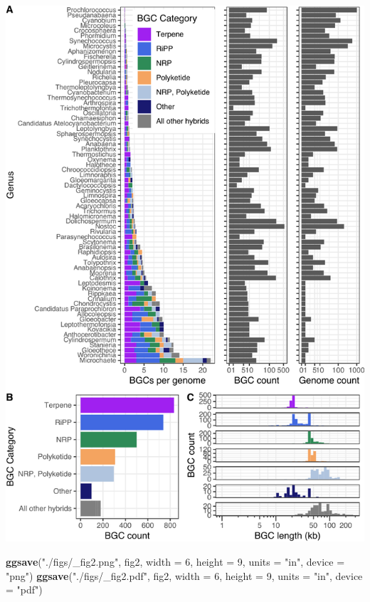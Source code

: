 \documentclass[
]{article}
\newenvironment{Shaded}{\begin{snugshade}}{\end{snugshade}}
\newcommand{\AttributeTok}[1]{\textcolor[rgb]{0.13,0.29,0.53}{#1}}
\newcommand{\DecValTok}[1]{\textcolor[rgb]{0.00,0.00,0.81}{#1}}
\newcommand{\FunctionTok}[1]{\textcolor[rgb]{0.13,0.29,0.53}{\textbf{#1}}}
\newcommand{\NormalTok}[1]{#1}
\newcommand{\StringTok}[1]{\textcolor[rgb]{0.31,0.60,0.02}{#1}}
\begin{document}
\includegraphics{analysis_files/figure-latex/unnamed-chunk-17-1.pdf}

\begin{Shaded}
\begin{Highlighting}[]
\FunctionTok{ggsave}\NormalTok{(}\StringTok{"./figs/\_fig2.png"}\NormalTok{, fig2, }\AttributeTok{width =} \DecValTok{6}\NormalTok{, }\AttributeTok{height =} \DecValTok{9}\NormalTok{, }\AttributeTok{units =} \StringTok{"in"}\NormalTok{, }\AttributeTok{device =} \StringTok{"png"}\NormalTok{)}
\FunctionTok{ggsave}\NormalTok{(}\StringTok{"./figs/\_fig2.pdf"}\NormalTok{, fig2, }\AttributeTok{width =} \DecValTok{6}\NormalTok{, }\AttributeTok{height =} \DecValTok{9}\NormalTok{, }\AttributeTok{units =} \StringTok{"in"}\NormalTok{, }\AttributeTok{device =} \StringTok{"pdf"}\NormalTok{)}
\end{Highlighting}
\end{Shaded}
\end{document}
